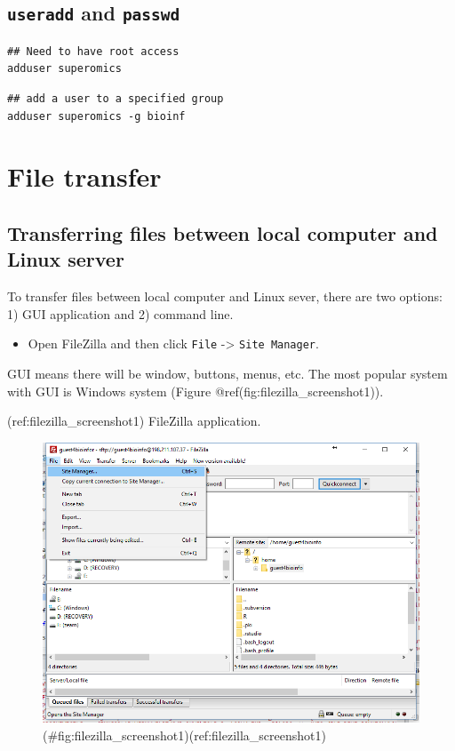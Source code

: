 \documentclass[]{book}
\providecommand{\tightlist}{%
  \setlength{\itemsep}{0pt}\setlength{\parskip}{0pt}}
\begin{document}
\hypertarget{useradd-and-passwd}{%
\section{\texorpdfstring{\texttt{useradd} and \texttt{passwd}}{useradd and passwd}}\label{useradd-and-passwd}}

\begin{verbatim}
## Need to have root access
adduser superomics 
\end{verbatim}

\begin{verbatim}
## add a user to a specified group
adduser superomics -g bioinf
\end{verbatim}

\hypertarget{file-transfer}{%
\chapter{File transfer}\label{file-transfer}}

\hypertarget{transferring-files-between-local-computer-and-linux-server}{%
\section{Transferring files between local computer and Linux server}\label{transferring-files-between-local-computer-and-linux-server}}

To transfer files between local computer and Linux sever, there are two options: 1) GUI application and 2) command line.

\begin{itemize}
\tightlist
\item
  Open FileZilla and then click \texttt{File} -\textgreater{} \texttt{Site\ Manager}.
\end{itemize}

GUI means there will be window, buttons, menus, etc. The most popular system with GUI is Windows system (Figure @ref(fig:filezilla\_screenshot1)).

(ref:filezilla\_screenshot1) FileZilla application.

\begin{figure}
\centering
\includegraphics{figures/filezilla_screenshot1.png}
\caption{(\#fig:filezilla\_screenshot1)(ref:filezilla\_screenshot1)}
\end{figure}
\end{document}
